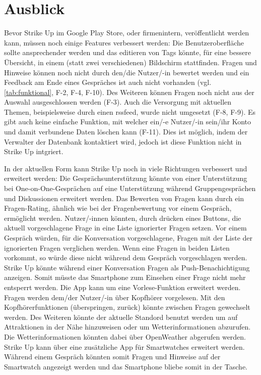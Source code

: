 \chapter{Ausblick}
\label{ch:ausblick}

Bevor Strike Up im Google Play Store, oder firmenintern, veröffentlicht werden kann, müssen noch einige Features verbessert werden: Die Benutzeroberfläche sollte ansprechender werden
und das editieren von Tags könnte, für eine bessere Übersicht, in einem (statt zwei verschiedenen) Bildschirm stattfinden. \newline
Fragen und Hinweise können noch nicht durch den/die Nutzer/-in bewertet werden und ein Feedback am Ende eines Gespräches ist auch nicht vorhanden (vgl. \ref{tab:funktional}, F-2, F-4, F-10).
Des Weiteren können Fragen noch nicht aus der Auswahl ausgeschlossen werden (F-3). Auch die Versorgung mit aktuellen Themen, beispielsweise durch einen \gls{rssfeed}, wurde nicht umgesetzt (F-8, F-9).
Es gibt auch keine einfache Funktion, mit welcher ein/-e Nutzer/-in sein/ihr Konto und damit verbundene Daten löschen kann (F-11). Dies ist möglich, indem der Verwalter der Datenbank kontaktiert wird,
jedoch ist diese Funktion nicht in Strike Up intgriert.

In der aktuellen Form kann Strike Up noch in viele Richtungen verbessert und erweitert werden: Die Gesprächsunterstützung könnte von einer Unterstützung bei One-on-One-Gesprächen auf
eine Unterstützung während Gruppengesprächen und Diskussionen erweitert werden. \newline
Das Bewerten von Fragen kann durch ein Fragen-Rating, ähnlich wie bei der Fragenbewertung vor einem Gespräch, ermöglicht werden. \newline
Nutzer/-innen könnten, durch drücken eines Buttons, die aktuell vorgeschlagene Frage in eine Liste ignorierter Fragen setzen. Vor einem Gespräch würden, für die Konversation vorgeschlagene, Fragen
mit der Liste der ignorierten Fragen verglichen werden. Wenn eine Fragen in beiden Listen vorkommt, so würde diese nicht während dem Gespräch vorgeschlagen werden. \newline
Strike Up könnte während einer Konversation Fragen als Push-Benachichtigung anzeigen. Somit müsste das Smartphone zum Einsehen einer Frage nicht mehr entsperrt werden. \newline
Die App kann um eine Vorlese-Funktion erweitert werden. Fragen werden dem/der Nutzer/-in über Kopfhörer vorgelesen. Mit den Kopfhörerfunktionen (überspringen, zurück) könnte zwischen Fragen
gewechselt werden. \newline
Des Weiteren könnte der aktuelle Standord benutzt werden um auf Attraktionen in der Nähe hinzuweisen oder um Wetterinformationen abzurufen. Die Wetterinformationen könnten dabei über
OpenWeather \cite{misc:openweather} abgerufen werden. \newline
Strike Up kann über eine zusätzliche App für Smartwatches erweitert werden. Während einem Gespräch könnten somit Fragen und Hinweise auf der Smartwatch angezeigt werden und das Smartphone
bliebe somit in der Tasche.

